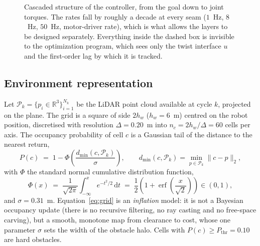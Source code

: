 \documentclass[11pt,a4paper]{article}
\newcommand{\R}{\mathbb{R}}
\begin{document}
\begin{figure}[htbp]
  \caption{Cascaded structure of the controller, from the goal down to joint torques. The rates fall by
  roughly a decade at every seam ($1$~Hz, $8$~Hz, $50$~Hz, motor-driver rate), which is what allows the
  layers to be designed separately. Everything inside the dashed box is invisible to the optimization
  program, which sees only the twist interface $u$ and the first-order lag by which it is tracked.}
  \label{fig:cascade}
\end{figure}

\subsection{Environment representation}
\label{sec:grid}

Let $\mathcal{P}_k=\{p_i\in\R^3\}_{i=1}^{N_k}$ be the LiDAR point cloud available at cycle $k$, projected on
the plane. The grid is a square of side $2h_w$ ($h_w=6$~m) centred on the robot position, discretised with
resolution $\Delta=0.20$~m into $n_c=2h_w/\Delta=60$ cells per axis. The occupancy probability of cell $c$ is
a Gaussian tail of the distance to the nearest return,
\begin{equation}
  P(c) \;=\; 1-\Phi\!\left(\frac{d_{\min}(c,\mathcal{P}_k)}{\sigma}\right),
  \qquad d_{\min}(c,\mathcal{P}_k)=\min_{p\in\mathcal{P}_k}\|c-p\|_2 ,
  \label{eq:grid}
\end{equation}
with $\Phi$ the standard normal cumulative distribution function,
\begin{equation}
  \Phi(x) \;=\; \frac{1}{\sqrt{2\pi}}\int_{-\infty}^{x}e^{-t^2/2}\,\mathrm{d}t
  \;=\; \frac{1}{2}\left(1+\operatorname{erf}\!\left(\frac{x}{\sqrt{2}}\right)\right)\in(0,1),
  \label{eq:phi}
\end{equation}
and $\sigma=0.31$~m. Equation~\eqref{eq:grid} is an \emph{inflation}
model: it is not a Bayesian occupancy update (there is no recursive filtering, no ray casting and no free-space
carving), but a smooth, monotone map from clearance to cost, whose one parameter $\sigma$ sets the width of
the obstacle halo. Cells with $P(c)\ge P_{\mathrm{thr}}=0.10$ are hard obstacles.
\end{document}
